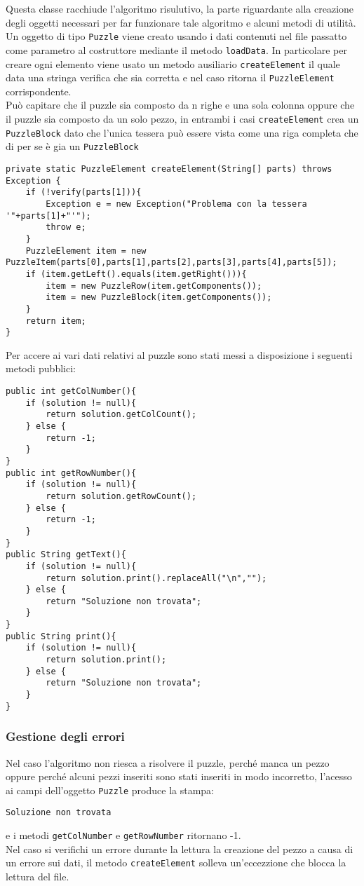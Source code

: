 \documentclass[a4paper, 11pt]{article}
\begin{document}
Questa classe racchiude l'algoritmo risulutivo, la parte riguardante alla creazione degli oggetti necessari per far funzionare tale algoritmo e alcuni metodi di utilità.
Un oggetto di tipo \texttt{Puzzle} viene creato usando i dati contenuti nel file passatto come parametro al costruttore mediante il metodo \texttt{loadData}.
In particolare per creare ogni elemento viene usato un metodo ausiliario \texttt{createElement} il quale data una stringa verifica che sia corretta e nel caso ritorna il \texttt{PuzzleElement} corrispondente.\\
Può capitare che il puzzle sia composto da n righe e una sola colonna oppure che il puzzle sia composto da un solo pezzo, in entrambi i casi \texttt{createElement} crea un \texttt{PuzzleBlock} dato che l'unica tessera può essere vista come una riga completa che di per se è gia un \texttt{PuzzleBlock}
\begin{lstlisting}
private static PuzzleElement createElement(String[] parts) throws Exception {
	if (!verify(parts[1])){
        Exception e = new Exception("Problema con la tessera '"+parts[1]+"'");
        throw e;
    }
    PuzzleElement item = new PuzzleItem(parts[0],parts[1],parts[2],parts[3],parts[4],parts[5]);
    if (item.getLeft().equals(item.getRight())){
        item = new PuzzleRow(item.getComponents());
        item = new PuzzleBlock(item.getComponents());
    }
    return item;
}
\end{lstlisting}
Per accere ai vari dati relativi al puzzle sono stati messi a disposizione i seguenti metodi pubblici:
\begin{lstlisting}
public int getColNumber(){
    if (solution != null){
        return solution.getColCount();
    } else {
        return -1;
    }
}
public int getRowNumber(){
    if (solution != null){
        return solution.getRowCount();
    } else {
        return -1;
    }
}
public String getText(){
    if (solution != null){
        return solution.print().replaceAll("\n","");
    } else {
        return "Soluzione non trovata";
    }
}
public String print(){
    if (solution != null){
        return solution.print();
    } else {
        return "Soluzione non trovata";
    }
}
\end{lstlisting}
\subsubsection{Gestione degli errori}
Nel caso l’algoritmo non riesca a risolvere il puzzle, perché manca un pezzo oppure perché alcuni pezzi inseriti sono stati inseriti in modo incorretto, l'acesso ai campi dell'oggetto \texttt{Puzzle} produce la stampa:
\begin{center}
\texttt{Soluzione non trovata}
\end{center}
e i metodi \texttt{getColNumber} e \texttt{getRowNumber} ritornano -1.\\
Nel caso si verifichi un errore durante la lettura la creazione del pezzo a causa di un errore sui dati, il metodo \texttt{createElement} solleva un’eccezzione che blocca la lettura del file.
\end{document}
